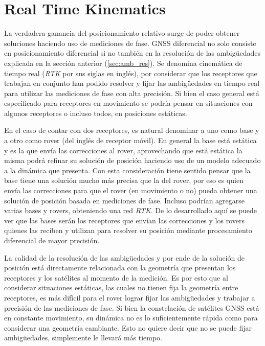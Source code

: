 \documentclass[a4paper,12pt,oneside,onecolumn,final,openright]{book}%
\begin{document}
\section{Real Time Kinematics}
	La verdadera ganancia del posicionamiento relativo surge de poder obtener soluciones haciendo uso de mediciones de fase. GNSS diferencial no solo consiste en posicionamiento diferencial si no también en la resolución de las ambigüedades explicada en la sección anterior (\ref{sec:amb_res}). Se denomina cinemática de tiempo real (\textit{RTK} por sus siglas en inglés), por considerar que los receptores que trabajan en conjunto han podido resolver y fijar las ambigüedades en tiempo real para utilizar las mediciones de fase con alta precisión. Si bien el caso general está especificado para receptores en movimiento se podría pensar en situaciones con algunos receptores o incluso todos, en posiciones estáticas.

	En el caso de contar con dos receptores, es natural denominar a uno como base y a otro como rover (del inglés de receptor móvil). En general la base está estática y es la que envía las correcciones al rover, aprovechando que está estática la misma podrá refinar su solución de posición haciendo uso de un modelo adecuado a la dinámica que presenta. Con esta consideración tiene sentido pensar que la base tiene una solución mucho más precisa que la del rover, por eso es quien envía las correcciones para que el rover (en movimiento o no) pueda obtener una solución de posición basada en mediciones de fase. Incluso podrían agregarse varias bases y rovers, obteniendo una red \textit{RTK}. De lo desarrollado aquí se puede ver que las bases serán los receptores que envían las correcciones y los rovers quienes las reciben y utilizan para resolver su posición mediante procesamiento diferencial de mayor precisión.

	La calidad de la resolución de las ambigüedades y por ende de la solución de posición está directamente relacionada con la geometría que presentan los receptores y los satélites al momento de la medición. Es por esto que al considerar situaciones estáticas, las cuales no tienen fija la geometría entre receptores, es más difícil para el rover lograr fijar las ambigüedades y trabajar a precisión de las mediciones de fase. Si bien la constelación de satélites GNSS está en constante movimiento, su dinámica no es lo suficientemente rápida como para considerar una geometría cambiante. Esto no quiere decir que no se puede fijar ambigüedades, simplemente le llevará más tiempo. 
\end{document}
